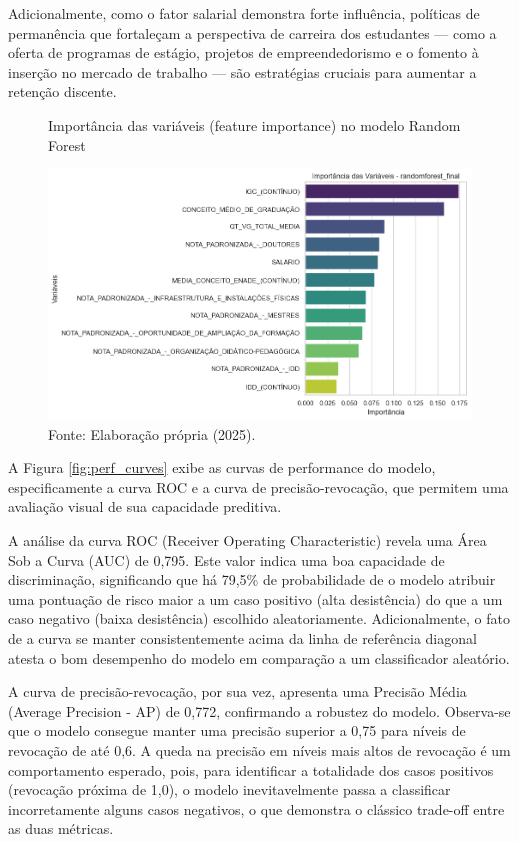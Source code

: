 Adicionalmente, como o fator salarial demonstra forte influência, políticas de permanência que fortaleçam a perspectiva de carreira dos estudantes — como a oferta de programas de estágio, projetos de empreendedorismo e o fomento à inserção no mercado de trabalho — são estratégias cruciais para aumentar a retenção discente.

\begin{figure}[H]
    \centering
    \caption{Importância das variáveis (feature importance) no modelo Random Forest}
    \label{fig:feat_imp}
    \includegraphics[width=\textwidth]{fig6_feature_importance.png}
    \caption*{Fonte: Elaboração própria (2025).}
\end{figure}

A Figura \ref{fig:perf_curves} exibe as curvas de performance do modelo, especificamente a curva ROC e a curva de precisão-revocação, que permitem uma avaliação visual de sua capacidade preditiva.

A análise da curva ROC (Receiver Operating Characteristic) revela uma Área Sob a Curva (AUC) de 0,795. Este valor indica uma boa capacidade de discriminação, significando que há 79,5\% de probabilidade de o modelo atribuir uma pontuação de risco maior a um caso positivo (alta desistência) do que a um caso negativo (baixa desistência) escolhido aleatoriamente. Adicionalmente, o fato de a curva se manter consistentemente acima da linha de referência diagonal atesta o bom desempenho do modelo em comparação a um classificador aleatório.

A curva de precisão-revocação, por sua vez, apresenta uma Precisão Média (Average Precision - AP) de 0,772, confirmando a robustez do modelo. Observa-se que o modelo consegue manter uma precisão superior a 0,75 para níveis de revocação de até 0,6. A queda na precisão em níveis mais altos de revocação é um comportamento esperado, pois, para identificar a totalidade dos casos positivos (revocação próxima de 1,0), o modelo inevitavelmente passa a classificar incorretamente alguns casos negativos, o que demonstra o clássico trade-off entre as duas métricas.

